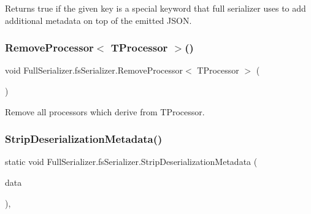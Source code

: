 Returns true if the given key is a special keyword that full serializer uses to add additional metadata on top of the emitted J\+S\+ON. 

\mbox{\label{class_full_serializer_1_1fs_serializer_ae4ee8d86aefa7d639f2c63552ad2ec3a}} 
\subsubsection{\texorpdfstring{Remove\+Processor$<$ T\+Processor $>$()}{RemoveProcessor< TProcessor >()}}
{\footnotesize\ttfamily void Full\+Serializer.\+fs\+Serializer.\+Remove\+Processor$<$ T\+Processor $>$ (\begin{DoxyParamCaption}{ }\end{DoxyParamCaption})\hspace{0.3cm}{\ttfamily [inline]}}



Remove all processors which derive from T\+Processor. 

\mbox{\label{class_full_serializer_1_1fs_serializer_a9adc1e64a01745e7cad713f39dc27630}} 
\subsubsection{\texorpdfstring{Strip\+Deserialization\+Metadata()}{StripDeserializationMetadata()}}
{\footnotesize\ttfamily static void Full\+Serializer.\+fs\+Serializer.\+Strip\+Deserialization\+Metadata (\begin{DoxyParamCaption}\item[{ref \hyperlink{class_full_serializer_1_1fs_data}{fs\+Data}}]{data }\end{DoxyParamCaption})\hspace{0.3cm}{\ttfamily [inline]}, {\ttfamily [static]}}



